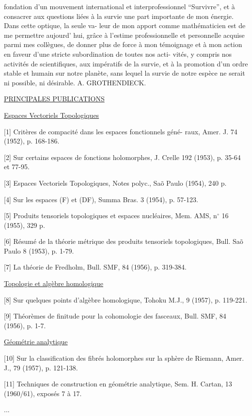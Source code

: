 
fondation d'un mouvement international et interprofessionnel
``Survivre'', et à consacrer aux questions liées à la survie une
part importante de mon énergie. Dans cette optique, la seule va-%
leur de mon apport comme mathématicien est de me permettre aujourd'%
hui, grâce à l'estime professionnelle et personnelle acquise parmi
mes collègues, de donner plus de force à mon témoignage et à mon
action en faveur d'une stricte subordination de toutes nos acti-%
vités, y compris nos activités de scientifiques, aux impératifs
de la survie, et à la promotion d'un ordre stable et humain sur
notre planète, sans lequel la survie de notre espèce ne serait
ni possible, ni désirable.
A. GROTHENDIECK.

\uline{PRINCIPALES PUBLICATIONS}

\uline{Espaces Vectoriels Topologiques}

[1] Critères de compacité dans les espaces fonctionnels géné-%
raux, Amer. J. 74 (1952), p. 168-186.

[2] Sur certains espaces de fonctions holomorphes, J. Crelle
192 (1953), p. 35-64 et 77-95.

[3] Espaces Vectoriels Topologiques, Notes polyc., Sa\~o Paulo
(1954), 240 p.

[4] Sur les espaces (F) et (DF), Summa Bras. 3 (1954),
p. 57-123.

[5] Produits tensoriels topologiques et espaces nucléaires,
Mem. AMS, n$^\circ$ 16 (1955), 329 p.

[6] Résumé de la théorie métrique des produits tensoriels
topologiques, Bull. Sa\~o Paulo 8 (1953), p. 1-79.

[7] La théorie de Fredholm, Bull. SMF, 84 (1956), p. 319-384.

\uline{Topologie et algèbre homologique}

[8] Sur quelques points d'algèbre homologique, Tohoku M.J.,
9 (1957), p. 119-221.

[9] Théorèmes de finitude pour la cohomologie des fasceaux,
Bull. SMF, 84 (1956), p. 1-7.

\uline{Géométrie analytique}

[10] Sur la classification des fibrés holomorphes sur la
sphère de Riemann, Amer. J., 79 (1957), p. 121-138.

[11] Techniques de construction en géométrie analytique,
Sem. H. Cartan, 13 (1960/61), exposés 7 à 17.

...

